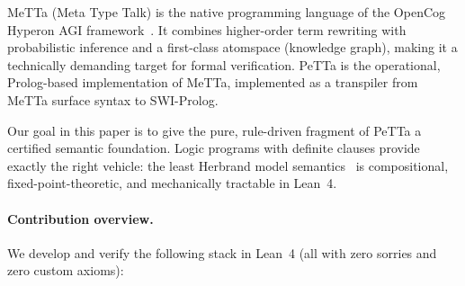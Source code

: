 \documentclass[]{article}
\newcommand{\MeTTa}{\textup{MeTTa}}
\newcommand{\PeTTa}{\textup{PeTTa}}
\begin{document}
\MeTTa{} (Meta Type Talk) is the native programming language of the OpenCog Hyperon
AGI framework~\cite{goertzel2009pln}.  It combines higher-order term rewriting
with probabilistic inference and a first-class atomspace (knowledge graph), making
it a technically demanding target for formal verification.  \PeTTa{} is the
operational, Prolog-based implementation of \MeTTa{}, implemented as a transpiler
from \MeTTa{} surface syntax to SWI-Prolog.

Our goal in this paper is to give the pure, rule-driven fragment of \PeTTa{} a
certified semantic foundation.  Logic programs with definite clauses provide exactly
the right vehicle: the least Herbrand model semantics~\cite{vanEmdenKowalski1976,Lloyd1987}
is compositional, fixed-point-theoretic, and mechanically tractable in Lean~4.

\paragraph{Contribution overview.}
We develop and verify the following stack in Lean~4 (all with zero sorries and zero
custom axioms):
\end{document}
